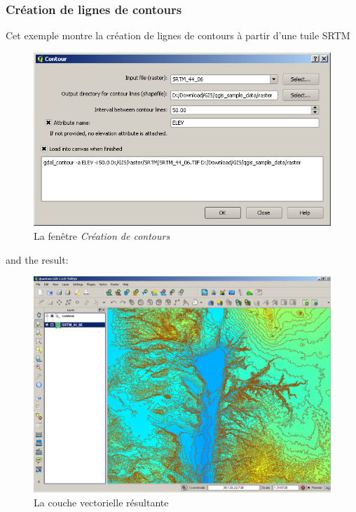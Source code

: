 {\subsubsection{Création de lignes de contours}
Cet exemple montre la création de lignes de contours à partir d'une tuile SRTM
\begin{figure}[ht]
   \centering
   \caption{\label{gdal_contour} La fenêtre \emph{Création de contours} \nixcaption}
   \includegraphics[clip=true, width=12cm]{plugins_gdaltools_images/gdal_contour}
\end{figure}
and the result:
\begin{figure}[ht]
   \centering
   \caption{\label{gdal_contour} La couche vectorielle résultante \nixcaption}
   \includegraphics[clip=true, width=12cm]{plugins_gdaltools_images/qgis_contours}
\end{figure}

}
